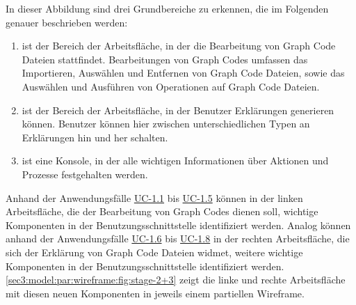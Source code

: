 In dieser Abbildung sind drei Grundbereiche zu erkennen, die im Folgenden genauer beschrieben werden:
\begin{enumerate}
    \item[\circitem{1}] ist der Bereich der Arbeitsfläche, in der die Bearbeitung von Graph Code Dateien stattfindet.
    Bearbeitungen von Graph Codes umfassen das Importieren, Auswählen und Entfernen von Graph Code Dateien, sowie das Auswählen und Ausführen von Operationen auf Graph Code Dateien.
    \item[\circitem{2}] ist der Bereich der Arbeitsfläche, in der Benutzer Erklärungen generieren können.
    Benutzer können hier zwischen unterschiedlichen Typen an Erklärungen hin und her schalten.
    \item[\circitem{3}] ist eine Konsole, in der alle wichtigen Informationen über Aktionen und Prozesse festgehalten werden.
\end{enumerate}
Anhand der Anwendungsfälle \hyperref[sec3:model:uc-1.1]{UC-1.1} bis \hyperref[sec3:model:uc-1.5]{UC-1.5} können in der linken Arbeitsfläche, die der Bearbeitung von Graph Codes dienen soll, wichtige Komponenten in der Benutzungsschnittstelle identifiziert werden.
Analog können anhand der Anwendungsfälle \hyperref[sec3:model:uc-1.6]{UC-1.6} bis \hyperref[sec3:model:uc-1.8]{UC-1.8} in der rechten Arbeitsfläche, die sich der Erklärung von Graph Code Dateien widmet, weitere wichtige Komponenten in der Benutzungsschnittstelle identifiziert werden.
\cref{sec3:model:par:wireframe:fig:stage-2+3} zeigt die linke und rechte Arbeitsfläche mit diesen neuen Komponenten in jeweils einem partiellen Wireframe.

